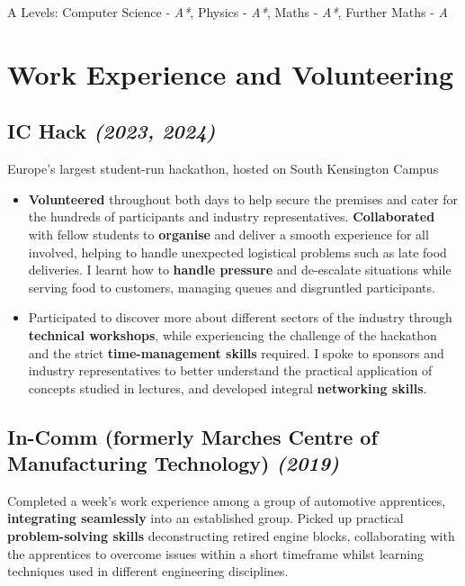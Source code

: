\documentclass{article}
\newcommand{\dates}[1]{\hfill\textit{(#1)}}
\newcommand{\tab}{\hspace{1.5em}}
\newcommand{\indentedblock}[1]{
    \hfill
    \begin{minipage}{\dimexpr\textwidth - 1.95em}
        #1
    \end{minipage}
}
\newcommand{\alevel}[2]{#1 - \textit{#2}}
\begin{document}
{\tab}A Levels: 
    \alevel{Computer Science}{A*},
    \alevel{Physics}{A*},
    \alevel{Maths}{A*},
    \alevel{Further Maths}{A}



\section*{Work Experience and Volunteering}

\subsection*{\textbf{IC Hack} \dates{2023, 2024}}
{\tab}Europe's largest student-run hackathon, hosted on South Kensington Campus

\begin{itemize}[topsep=0.5em]
    
    \item \textbf{Volunteered} throughout both days to help secure the premises and cater for the hundreds of participants and industry representatives. 
    \textbf{Collaborated} with fellow students to \textbf{organise} and deliver a smooth experience for all involved, helping to handle unexpected logistical problems such as late 
    food deliveries. I learnt how to \textbf{handle pressure} and de-escalate situations while serving food to customers, 
    managing queues and disgruntled participants.

    \item Participated to discover more about different sectors of the industry through \textbf{technical workshops}, 
    while experiencing the challenge of the hackathon and the strict \textbf{time-management skills} required.
    I spoke to sponsors and industry representatives to better understand the practical application of concepts studied in lectures, 
    and developed integral \textbf{networking skills}.

\end{itemize}


\subsection*{\textbf{In-Comm} (formerly Marches Centre of Manufacturing Technology) \dates{2019}}
\indentedblock{
    Completed a week's work experience among a group of automotive apprentices, \textbf{integrating seamlessly} into an established group.
    Picked up practical \textbf{problem-solving skills} deconstructing retired engine blocks, collaborating with the apprentices to 
    overcome issues within a short timeframe whilst learning techniques used in different engineering disciplines. 
}
\end{document}
